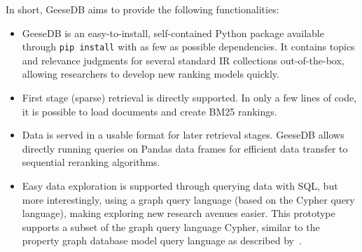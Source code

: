 In short, GeeseDB aims to provide the following functionalities:
\begin{itemize}
	\item GeeseDB is an easy-to-install, self-contained Python package available through \texttt{pip install} with as few as possible dependencies. It contains topics and relevance judgments for several standard IR collections out-of-the-box, allowing researchers to develop new ranking models quickly. 
	\item First stage (sparse) retrieval is directly supported. In only a few lines of code, it is possible to load documents and create BM25 rankings. 
	\item Data is served in a usable format for later retrieval stages. GeeseDB allows directly running queries on Pandas data frames for efficient data transfer to sequential reranking algorithms.
	\item Easy data exploration is supported through querying data with SQL, but more interestingly, using a graph query language (based on the Cypher query language), making exploring new research avenues easier. This prototype supports a subset of the graph query language Cypher, similar to the property graph database model query language as described by~\citet{angles2018property}.
\end{itemize}


